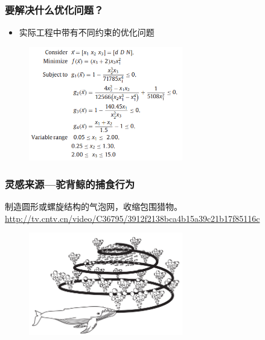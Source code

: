 \begin{frame}
  \frametitle{要解决什么优化问题？}
	\begin{itemize}
	\item {实际工程中带有不同约束的优化问题}
	\end{itemize}
\begin{figure}
\centering
\includegraphics[width=0.6\textwidth]{pic/whale_constraint.png}
\end{figure}
\end{frame}

\begin{frame}
  \frametitle{灵感来源---驼背鲸的捕食行为}
	\begin{block}{制造圆形或螺旋结构的气泡网，收缩包围猎物。}
	\url{http://tv.cntv.cn/video/C36795/3912f2138bca4b15a39c21b17f85116c}
	 \end{block}
\begin{figure}
\centering
\includegraphics[width=0.6\textwidth]{pic/whale_humpback.png}
\end{figure}

\end{frame}

